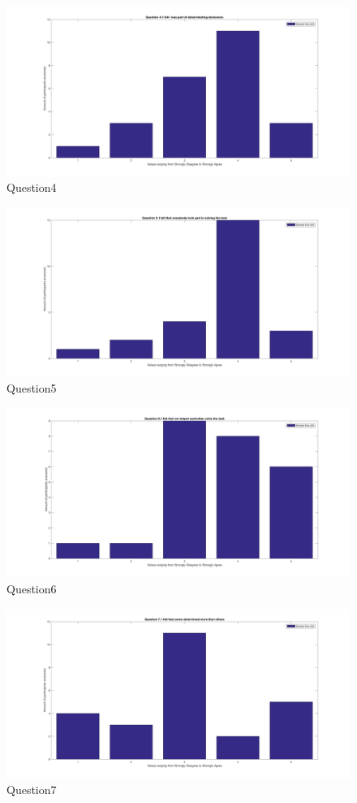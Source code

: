     \begin{figure}[H]
		\centering
		\includegraphics[width=0.9\linewidth]{figure/Appendices/Question4} 
		\caption{Question4}
	\end{figure}

    \begin{figure}[H]
		\centering
		\includegraphics[width=0.9\linewidth]{figure/Appendices/Question5} 
		\caption{Question5}
	\end{figure}

    \begin{figure}[H]
		\centering
		\includegraphics[width=0.9\linewidth]{figure/Appendices/Question6} 
		\caption{Question6}
	\end{figure}

    \begin{figure}[H]
		\centering
		\includegraphics[width=0.9\linewidth]{figure/Appendices/Question7} 
		\caption{Question7}
	\end{figure}

